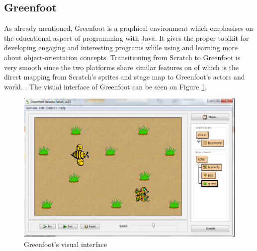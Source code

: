 \subsection{Greenfoot}
As already mentioned, Greenfoot is a graphical environment which emphasises on the educational aspect of programming with Java. It gives the proper toolkit for developing engaging and interesting programs while using and learning more about object-orientation concepts. Transitioning from Scratch to Greenfoot is very smooth since the two platforms share similar features on of which is the direct mapping from Scratch's sprites and stage map to Greenfoot's actors and world. \cite{MaloneyResnick10}. The visual interface of Greenfoot can be seen on Figure \ref{fig:grenfoot_environment}.
\begin{figure}[H]
\begin{center}
\includegraphics[scale=0.37]{./pics/greenfoot.png}
\caption{Greenfoot's visual interface}
\label{fig:grenfoot_environment}
\end{center}
\end{figure}


